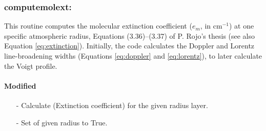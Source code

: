\documentclass[letterpaper,12pt]{article}
\begin{document}
\subsubsection{computemolext:}
This routine computes the molecular extinction coefficient ($e_m$, in
cm$^{-1}$) at one specific atmospheric radius, Equations
(3.36)--(3.37) of P. Rojo's thesis (see also Equation
\ref{eq:extinction}).  Initially, the code calculates the Doppler and
Lorentz line-broadening widths (Equations \ref{eq:doppler} and
\ref{eq:lorentz}), to later calculate the Voigt profile.

\paragraph{Modified}
\begin{enumerate}[leftmargin=10pt, noitemsep, parsep=0pt, topsep=0ex]
\item[-] Calculate  (Extinction coefficient) for the given radius layer.
\item[-] Set  of given radius to True.
\end{enumerate}
\end{document}
